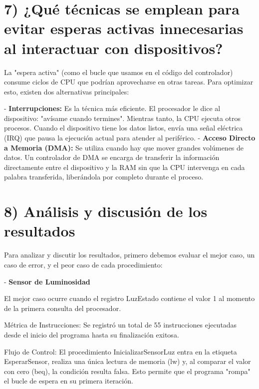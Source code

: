 \documentclass[12pt]{article}
\begin{document}
\vspace{1cm}
\vspace{1cm}

\section*{7) ¿Qué técnicas se emplean para evitar esperas activas innecesarias al interactuar con dispositivos?}

La "espera activa" (como el bucle que usamos en el código del controlador) consume ciclos de CPU que podrían aprovecharse en otras tareas. Para optimizar esto, existen dos alternativas principales:

- \textbf{Interrupciones:} Es la técnica más eficiente. El procesador le dice al dispositivo: "avísame cuando termines". Mientras tanto, la CPU ejecuta otros procesos. Cuando el dispositivo tiene los datos listos, envía una señal eléctrica (IRQ) que pausa la ejecución actual para atender al periférico.
- \textbf{Acceso Directo a Memoria (DMA):} Se utiliza cuando hay que mover grandes volúmenes de datos. Un controlador de DMA se encarga de transferir la información directamente entre el dispositivo y la RAM sin que la CPU intervenga en cada palabra transferida, liberándola por completo durante el proceso.

\vspace{1cm}
\vspace{1cm}

\section*{8) Análisis y discusión de los resultados}

Para analizar y discutir los resultados, primero debemos evaluar el mejor caso, un caso de error, y el peor caso de cada procedimiento:

- \textbf{Sensor de Luminosidad}

El mejor caso ocurre cuando el registro LuzEstado contiene el valor 1 al momento de la primera consulta del procesador.

Métrica de Instrucciones: Se registró un total de 55 instrucciones ejecutadas desde el inicio del programa hasta su finalización exitosa.

Flujo de Control: El procedimiento InicializarSensorLuz entra en la etiqueta EsperarSensor, realiza una única lectura de memoria (lw) y, al comparar el valor con cero (beq), la condición resulta falsa. Esto permite que el programa "rompa" el bucle de espera en su primera iteración.
\end{document}
